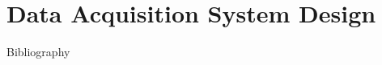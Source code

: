 \documentclass[11pt, twoside, a4paper]{scrreprt}
\begin{document}
    \cleardoublepage

    \cleardoublepage

    \cleardoublepage

  \part{Data Acquisition System Design}

    \cleardoublepage

    \cleardoublepage

    \cleardoublepage

    \cleardoublepage


  \cleardoublepage

  \listoffigures
  \cleardoublepage

  \listoftables
  \cleardoublepage

  
  \cleardoublepage

  Bibliography
  \printbibliography
  \cleardoublepage
\end{document}
